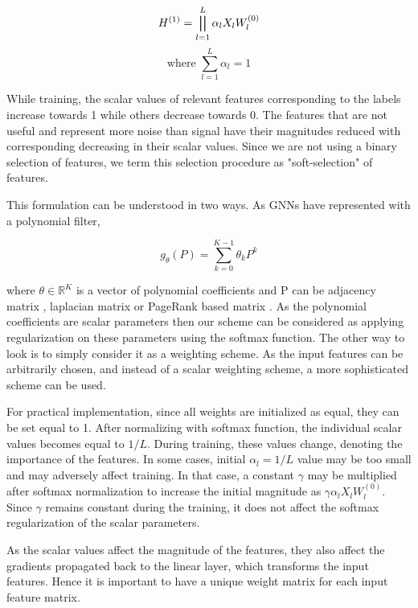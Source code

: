 \documentclass[sigconf,natbib=false]{acmart}
\begin{document}
\begin{equation}
H^{(1)} = \bigparallel^{L}_{l=1} \alpha_lX_lW_{l}^{(0)}
\end{equation}
$$ \textrm{where         }   \sum_{l=1}^{L}\alpha_{l} = 1$$



 While training, the scalar values of relevant features corresponding to the labels increase towards 1 while others decrease towards 0. The features that are not useful and represent more noise than signal have their magnitudes reduced with corresponding decreasing in their scalar values. Since we are not using a binary selection of features, we term this selection procedure as "soft-selection" of features.
 

This formulation can be understood in two ways. As GNNs have represented with a polynomial filter, 

\begin{equation}
    g_\theta(P) = \sum_{k=0}^{K-1}\theta_kP^k
\end{equation}

where $\theta \in \mathbb{R}^K$ is a vector of polynomial coefficients and P can be adjacency matrix \cite{kipf_semi-supervised_2017}\cite{chen_simple_2020}, laplacian matrix \cite{nt_stacked_2020} or PageRank based matrix \cite{berberidis_adaptive_2019}. As the polynomial coefficients are scalar parameters then our scheme can be considered as applying regularization on these parameters using the softmax function. The other way to look is to simply consider it as a weighting scheme. As the input features can be arbitrarily chosen, and instead of a scalar weighting scheme, a more sophisticated scheme can be used. 

 For practical implementation, since all weights are initialized as equal, they can be set equal to 1. After normalizing with softmax function, the individual scalar values becomes equal to $1/L$. During training, these values change, denoting the importance of the features. In some cases, initial $\alpha_l = 1/L$ value may be too small and may adversely affect training. In that case, a constant $\gamma$ may be multiplied after softmax normalization to increase the initial magnitude as $\gamma\alpha_lX_lW_{l}^{(0)}$. Since $\gamma$ remains constant during the training, it does not affect the softmax regularization of the scalar parameters. 
 
 As the scalar values affect the magnitude of the features, they also affect the gradients propagated back to the linear layer, which transforms the input features. Hence it is important to have a unique weight matrix for each input feature matrix.
\end{document}
